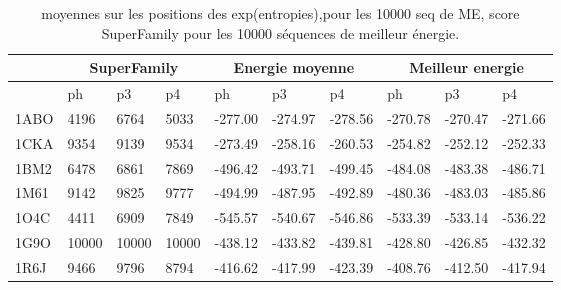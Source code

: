 \documentclass[a4paper,12pt]{article}
\begin{document}
    \begin{table}[!htbp]
      \centering
      
      \begin{tabular}{|l|l|l|l||l|l|l||l|l|l|}
        \hline
        \multicolumn{1}{|c|}{} &\multicolumn{3}{c||}{SuperFamily} & \multicolumn{3}{c||}{Energie moyenne} & \multicolumn{3}{c|}{Meilleur energie} \\ \hline

             & ph & p3 & p4 & ph & p3 & p4 & ph & p3 & p4  \\ \hline      
        1ABO &   4196 &  6764  &  5033 & -277.00 & -274.97 & -278.56 & -270.78 & -270.47 & -271.66   \\ \hline      
        1CKA &   9354 &  9139  &  9534 & -273.49 & -258.16 & -260.53 & -254.82 & -252.12 & -252.33   \\ \hline      
        1BM2 &   6478 &  6861  &  7869 & -496.42 & -493.71 & -499.45 & -484.08 & -483.38 & -486.71   \\ \hline      
        1M61 &   9142 &  9825  &  9777 & -494.99 & -487.95 & -492.89 & -480.36 & -483.03 & -485.86   \\ \hline      
        1O4C &   4411 &  6909  &  7849 & -545.57 & -540.67 & -546.86 & -533.39 & -533.14 & -536.22   \\ \hline      
        1G9O &  10000 & 10000  & 10000 & -438.12 & -433.82 & -439.81 & -428.80 & -426.85 & -432.32   \\ \hline      
        1R6J &   9466 &  9796  &  8794 & -416.62 & -417.99 & -423.39 & -408.76 & -412.50 & -417.94   \\ \hline      


        \hline
      \end{tabular}
      \caption{moyennes sur les positions des exp(entropies),pour les 10000 seq de ME, score SuperFamily pour les 10000 séquences de meilleur énergie.}      
      \label{tab_MCvsHeur}

    \end{table}
\end{document}
